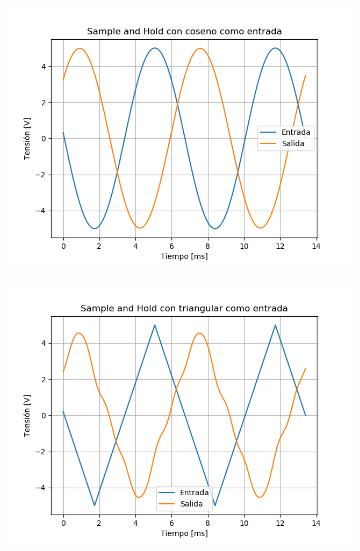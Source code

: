 \begin{figure}[H]
	\begin{subfigure}{.5\textwidth}
	\centering
	\includegraphics[width=\textwidth]{ImagenesEjercicio6/puntoa/SH - Cos.png}
	\end{subfigure}
	\begin{subfigure}{.5\textwidth}
	\centering
	\includegraphics[width=\textwidth]{ImagenesEjercicio6/puntoa/SH - Tri.png}
	\end{subfigure}
\end{figure}

